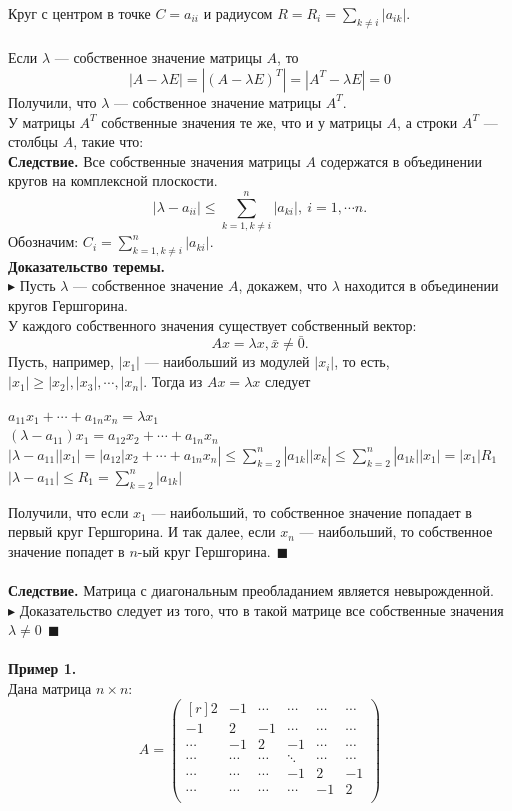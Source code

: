 \documentclass[12pt]{article}
\theoremstyle{definition}
\numberwithin{equation}{section}
\begin{document}
Круг с центром в точке $C=a_{ii}$ и радиусом $R=R_i=\sum\limits_{k\neq i}|a_{ik}|.$\\
\\
Если $\lambda$ --- собственное значение матрицы $A$, то
$$|A-\lambda E|=|(A-\lambda E)^T|=|A^T-\lambda E|=0$$
Получили, что $\lambda$ --- собственное значение матрицы $A^T$.\\ 
У матрицы $A^T$ собственные значения те же, что и у матрицы $A$, а строки $A^T$ --- столбцы $A$, такие что:\\
\textbf{Следствие.} Все собственные значения матрицы $A$ содержатся в объединении кругов на комплексной плоскости. $$|\lambda-a_{ii}|\leqslant \sum\limits_{k=1, k\neq i}^n|a_{ki}|,~i=1,\cdots n.$$
Обозначим: $C_i=\sum\limits_{k=1, k\neq i}^n|a_{ki}|.$\\
\textbf{Доказательство теремы.}\\
$\blacktriangleright$ Пусть $\lambda$ --- собственное значение $A$, докажем, что $\lambda$ находится в объединении кругов Гершгорина.\\
У каждого собственного значения существует собственный вектор: $$Ax=\lambda x, \bar x\neq \bar 0.$$
Пусть, например, $|x_1|$ --- наибольший из модулей $|x_i|$, то есть, $|x_1|\geqslant|x_2|,|x_3|,\cdots,|x_n|$. Тогда из $Ax=\lambda x$ следует
\begin{center}
$a_{11}x_1+\cdots+a_{1n}x_n=\lambda x_1$\\
$(\lambda-a_{11})x_1=a_{12}x_2+\cdots+a_{1n}x_n$\\
$|\lambda-a_{11}||x_1|=|a_{12}|x_2+\cdots+a_{1n}x_n|\leqslant\sum\limits_{k=2}^n|a_{1k}||x_k|\leqslant\sum\limits_{k=2}^n|a_{1k}||x_1|=|x_1|R_1$\\
$|\lambda-a_{11}|\leqslant R_1=\sum\limits_{k=2}^n|a_{1k}|$
\end{center}
Получили, что если $x_1$ --- наибольший, то собственное значение попадает в первый круг Гершгорина. И так далее, если $x_n$ --- наибольший, то собственное значение попадет в $n$-ый круг Гершгорина.$~~\blacksquare$\\ \\
\textbf{Следствие.} Матрица с диагональным преобладанием является невырожденной.\\
$\blacktriangleright$ Доказательство следует из того, что в такой матрице все собственные значения $\lambda\neq 0~~\blacksquare$\\ \\
\textbf{Пример 1.}\\
Дана матрица $n\times n$:
\[A=\begin{pmatrix}[r]
2 & -1 & \cdots & \cdots & \cdots & \cdots\\
-1 & 2 & -1 & \cdots & \cdots & \cdots\\
\cdots & -1 & 2 & -1 & \cdots & \cdots\\
\cdots & \cdots & \cdots & \ddots & \cdots & \cdots\\
\cdots & \cdots & \cdots & -1 & 2 & -1\\
\cdots & \cdots & \cdots & \cdots & -1 & 2\\
\end{pmatrix}\]
\end{document}
